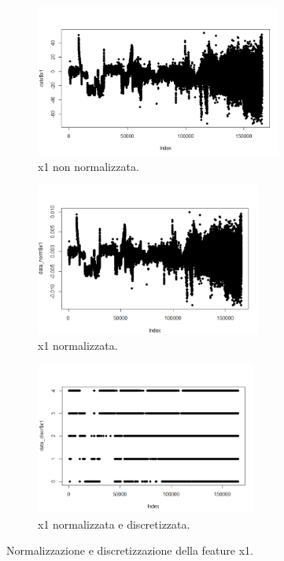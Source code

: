 \documentclass[12pt]{article}
\begin{document}
\begin{figure}[h]	
	\begin{subfigure}{0.5\textwidth}
		\includegraphics[width=0.9\linewidth, height=5cm]{images/x1notnormalize.PNG} 
		\caption{x1 non normalizzata.}
		\label{fig:x1nonNormalize}
	\end{subfigure}
	\begin{subfigure}{0.5\textwidth}
		\includegraphics[width=0.9\linewidth, height=5cm]{images/x1normalize.PNG}
		\caption{x1 normalizzata.}
		\label{fig:subim2}
	\end{subfigure}
	\begin{subfigure}{0.5\textwidth}
		\includegraphics[width=0.9\linewidth, height=5cm]{images/x1discretize.PNG}
		\caption{x1 normalizzata e discretizzata.}
		\label{fig:subim3}
	\end{subfigure}
	\caption{Normalizzazione e discretizzazione della feature x1.}
	\label{x1}
\end{figure}
\end{document}
